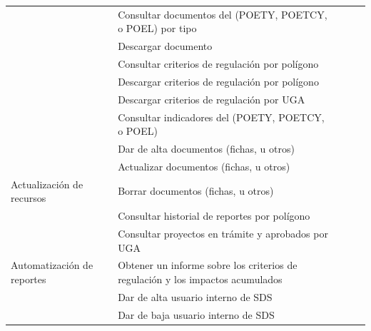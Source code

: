 \begin{longtable}{p{4cm} p{7cm} p{.5cm} p{.5cm} p{.5cm}}
 & Consultar documentos del (POETY, POETCY, o POEL) por tipo &\cellcolor{myotroazul} &\cellcolor{myotroazul} &\cellcolor{myotroazul} \\

 & Descargar documento &\cellcolor{myotroazul} &\cellcolor{myotroazul} &\cellcolor{myotroazul} \\

 & Consultar criterios de regulación por polígono &\cellcolor{myotroazul} &\cellcolor{myotroazul} &\cellcolor{myotroazul} \\

 & Descargar criterios de regulación por polígono &\cellcolor{myotroazul} &\cellcolor{myotroazul} &\cellcolor{myotroazul} \\

 & Descargar criterios de regulación por UGA & \cellcolor{myotroazul}&\cellcolor{myotroazul} &\cellcolor{myotroazul} \\

 & Consultar indicadores del (POETY, POETCY, o POEL) &\cellcolor{myotroazul} &\cellcolor{myotroazul} & \cellcolor{myotroazul}  \\
\hline
  & Dar de alta documentos (fichas, u otros) &\cellcolor{myotroazul}  & &\cellcolor{myotroazul} \\
 & Actualizar documentos (fichas, u otros) &\cellcolor{myotroazul}  & &\cellcolor{myotroazul} \\


Actualización de recursos & Borrar documentos (fichas, u otros) &\cellcolor{myotroazul} & &\cellcolor{myotroazul} \\

 & Consultar historial de reportes por polígono &\cellcolor{myotroazul}  &  &\cellcolor{myotroazul} \\

 & Consultar proyectos en trámite y aprobados por UGA  &\cellcolor{myotroazul}  &  &\cellcolor{myotroazul} \\

\hline
Automatización de reportes &
Obtener un informe sobre los criterios de regulación y los impactos acumulados & \cellcolor{myotroazul}& & \cellcolor{myotroazul}\\

\hline
 & Dar de alta usuario interno de SDS & & &  \cellcolor{myotroazul}\\

 & Dar de baja usuario interno de SDS  &  & & \cellcolor{myotroazul}\\


\end{longtable}
